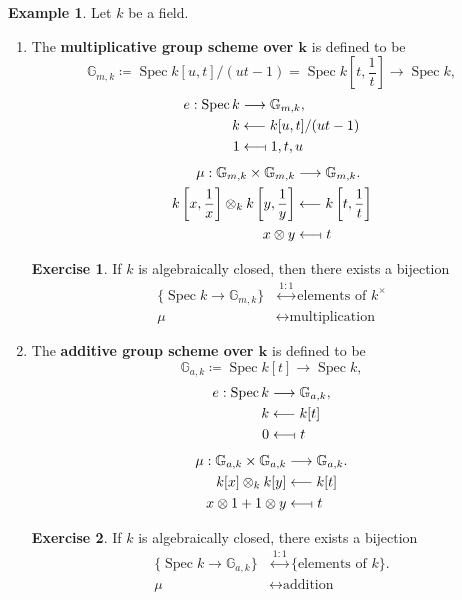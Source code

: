 \documentclass[12pt]{article}
\DeclareMathOperator{\Spec}{Spec}
\theoremstyle{definition}
\newtheorem*{exercise}{Exercise}
\newtheorem*{example}{Example}
\begin{document}
\begin{example}
Let $k$ be a field.

\begin{enumerate}[label=\arabic*)]
\item The \textbf{multiplicative group scheme over $\boldsymbol k$} is defined to be
\[\mathbb G_{m,k}\coloneqq\Spec k[u,t]/(ut-1)=\Spec k\left[t,\frac1t\right]\longrightarrow\Spec k,\]
\begin{align*}
e:\Spec k&\longrightarrow\mathbb G_{m,k},\\k&\longleftarrow k[u,t]/(ut-1)\\1&\longleftarrow\!\shortmid1,t,u
\end{align*}
\begin{align*}
\mu:\mathbb G_{m,k}\times\mathbb G_{m,k}&\longrightarrow\mathbb G_{m,k}.\\k\left[x,\frac1x\right]\otimes_k k\left[y,\frac1y\right]&\longleftarrow k\left[t,\frac1t\right]\\x\otimes y&\longleftarrow\!\shortmid t
\end{align*}

\begin{exercise}
If $k$ is algebraically closed, then there exists a bijection
\begin{align*}
\{\Spec k\rightarrow\mathbb G_{m,k}\}&\overset{1:1}\longleftrightarrow\text{elements of }k^\times\\\mu&\longleftrightarrow\text{multiplication}
\end{align*}
\end{exercise}

\item The \textbf{additive group scheme over $\boldsymbol k$} is defined to be
\[\mathbb G_{a,k}\coloneqq\Spec k[t]\longrightarrow\Spec k,\]
\begin{align*}
e:\Spec k&\longrightarrow\mathbb G_{a,k},\\k&\longleftarrow k[t]\\0&\longleftarrow\!\shortmid t
\end{align*}
\begin{align*}
\mu:\mathbb G_{a,k}\times\mathbb G_{a,k}&\longrightarrow\mathbb G_{a,k}.\\k[x]\otimes_kk[y]&\longleftarrow k[t]\\x\otimes1+1\otimes y&\longleftarrow\!\shortmid t
\end{align*}

\begin{exercise}
If $k$ is algebraically closed, there exists a bijection
\begin{align*}
\{\Spec k\rightarrow\mathbb G_{a,k}\}&\overset{1:1}\longleftrightarrow\{\text{elements of }k\}.\\\mu&\longleftrightarrow\text{addition}
\end{align*}
\end{exercise}


\end{enumerate}
\end{example}
\end{document}
